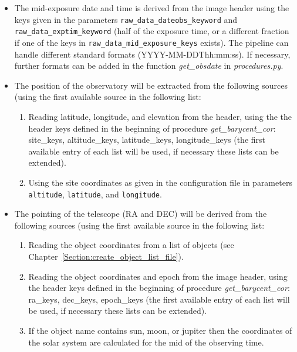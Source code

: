 \documentclass[10pt,a4paper]{article}
\begin{document}
\begin{itemize}
 \item The mid-exposure date and time is derived from the image header using the keys given in the parameters \verb|raw_data_dateobs_keyword| and \verb|raw_data_exptim_keyword| (half of the exposure time, or a different fraction if one of the keys in \verb|raw_data_mid_exposure_keys| exists). The pipeline can handle different standard formats (YYYY-MM-DDThh:mm:ss). If necessary, further formats can be added in the function \textit{get\_obsdate} in \textit{procedures.py}.
 \item The position of the observatory will be extracted from the following sources (using the first available source in the following list:
 \begin{enumerate}\setlength\itemsep{0em}
  \item Reading latitude, longitude, and elevation from the header, using the the header keys defined in the beginning of procedure \textit{get\_barycent\_cor}: site\_keys, altitude\_keys, latitude\_keys, longitude\_keys (the first available entry of each list will be used, if necessary these lists can be extended).
  \item Using the site coordinates as given in the configuration file in parameters \verb|altitude|, \verb|latitude|, and \verb|longitude|.
 \end{enumerate}
 \item The pointing of the telescope (RA and DEC) will be derived from the following sources (using the first available source in the following list:
 \begin{enumerate}\setlength\itemsep{0em}
  \item Reading the object coordinates from a list of objects (see Chapter~\ref{Section:create_object_list_file}).
  \item Reading the object coordinates and epoch from the image header, using the header keys defined in the beginning of procedure \textit{get\_barycent\_cor}: ra\_keys, dec\_keys, epoch\_keys (the first available entry of each list will be used, if necessary these lists can be extended).
  \item If the object name contains sun, moon, or jupiter then the coordinates of the solar system are calculated for the mid of the observing time.
 \end{enumerate}
\end{itemize}

\end{document}

